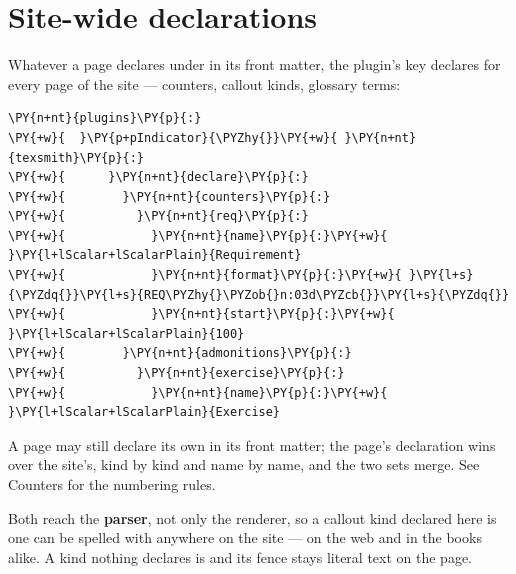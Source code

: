 \documentclass[a4paper,twoside]{article}
\begin{document}
\section{Site-wide declarations}
Whatever a page declares under  in its front matter, the
plugin's  key declares for every page of the site --- counters,
callout kinds, glossary terms:
\begin{tscode}[lang=yaml, engine=pygments]
\begin{Verbatim}[commandchars=\\\{\},breaklines, breakanywhere, commandchars=\\\{\}]
\PY{n+nt}{plugins}\PY{p}{:}
\PY{+w}{  }\PY{p+pIndicator}{\PYZhy{}}\PY{+w}{ }\PY{n+nt}{texsmith}\PY{p}{:}
\PY{+w}{      }\PY{n+nt}{declare}\PY{p}{:}
\PY{+w}{        }\PY{n+nt}{counters}\PY{p}{:}
\PY{+w}{          }\PY{n+nt}{req}\PY{p}{:}
\PY{+w}{            }\PY{n+nt}{name}\PY{p}{:}\PY{+w}{ }\PY{l+lScalar+lScalarPlain}{Requirement}
\PY{+w}{            }\PY{n+nt}{format}\PY{p}{:}\PY{+w}{ }\PY{l+s}{\PYZdq{}}\PY{l+s}{REQ\PYZhy{}\PYZob{}n:03d\PYZcb{}}\PY{l+s}{\PYZdq{}}
\PY{+w}{            }\PY{n+nt}{start}\PY{p}{:}\PY{+w}{ }\PY{l+lScalar+lScalarPlain}{100}
\PY{+w}{        }\PY{n+nt}{admonitions}\PY{p}{:}
\PY{+w}{          }\PY{n+nt}{exercise}\PY{p}{:}
\PY{+w}{            }\PY{n+nt}{name}\PY{p}{:}\PY{+w}{ }\PY{l+lScalar+lScalarPlain}{Exercise}
\end{Verbatim}
\end{tscode}
A page may still declare its own in its front matter; the page's declaration
wins over the site's, kind by kind and name by name, and the two sets merge.
See Counters for the numbering rules.

Both reach the \textbf{parser}, not only the renderer, so a callout kind declared
here is one  can be spelled with anywhere on the site --- on the
web and in the books alike. A kind nothing declares is 
and its fence stays literal text on the page.
\end{document}
